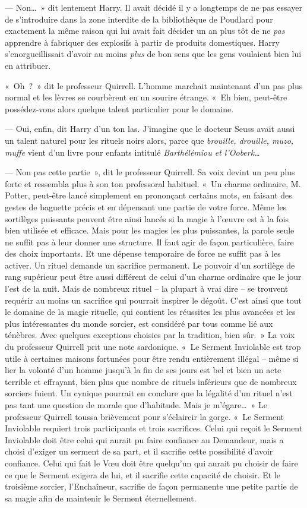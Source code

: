 --- Non…~» dit lentement Harry. Il avait décidé il y a longtemps de ne pas essayer de s'introduire dans la zone interdite de la bibliothèque de Poudlard pour exactement la même raison qui lui avait fait décider un an plus tôt de ne \emph{pas} apprendre à fabriquer des explosifs à partir de produits domestiques. Harry s'enorgueillissait d'avoir au moins \emph{plus} de bon sens que les gens voulaient bien lui en attribuer.

«~Oh~?~» dit le professeur Quirrell. L'homme marchait maintenant d'un pas plus normal et les lèvres se courbèrent en un sourire étrange. «~Eh bien, peut-être possédez-vous alors quelque talent particulier pour le domaine.

--- Oui, enfin, dit Harry d'un ton las. J'imagine que le docteur Seuss avait aussi un talent naturel pour les rituels noirs alors, parce que \emph{brouille, drouille, muzo, muffe} vient d'un livre pour enfants intitulé \emph{Barthélémiou et l'Ooberk}…

--- Non pas cette partie~», dit le professeur Quirrell. Sa voix devint un peu plus forte et ressembla plus à son ton professoral habituel. «~Un charme ordinaire, M. Potter, peut-être lancé simplement en prononçant certains mots, en faisant des gestes de baguette précis et en dépensant une partie de votre force. Même les sortilèges puissants peuvent être ainsi lancés si la magie à l'œuvre est à la fois bien utilisée et efficace. Mais pour les magies les plus puissantes, la parole seule ne suffit pas à leur donner une structure. Il faut agir de façon particulière, faire des choix importants. Et une dépense temporaire de force ne suffit pas à les activer. Un rituel demande un sacrifice permanent. Le pouvoir d'un sortilège de rang supérieur peut être aussi différent de celui d'un charme ordinaire que le jour l'est de la nuit. Mais de nombreux rituel -- la plupart à vrai dire -- se trouvent requérir au moins un sacrifice qui pourrait inspirer le dégoût. C'est ainsi que tout le domaine de la magie rituelle, qui contient les réussites les plus avancées et les plus intéressantes du monde sorcier, est considéré par tous comme lié aux ténèbres. Avec quelques exceptions choisies par la tradition, bien sûr.~» La voix du professeur Quirrell prit une note sardonique. «~Le Serment Inviolable est trop utile à certaines maisons fortunées pour être rendu entièrement illégal -- même si lier la volonté d'un homme jusqu'à la fin de ses jours est bel et bien un acte terrible et effrayant, bien plus que nombre de rituels inférieurs que de nombreux sorciers fuient. Un cynique pourrait en conclure que la légalité d'un rituel n'est pas tant une question de morale que d'habitude. Mais je m'égare…~» Le professeur Quirrell toussa brièvement pour s'éclaircir la gorge. «~Le Serment Inviolable requiert trois participants et trois sacrifices. Celui qui reçoit le Serment Inviolable doit être celui qui aurait pu faire confiance au Demandeur, mais a choisi d'exiger un serment de sa part, et il sacrifie cette possibilité d'avoir confiance. Celui qui fait le Vœu doit être quelqu'un qui aurait pu choisir de faire ce que le Serment exigera de lui, et il sacrifie cette capacité de choisir. Et le troisième sorcier, l'Enchaîneur, sacrifie de façon permanente une petite partie de sa magie afin de maintenir le Serment éternellement.

